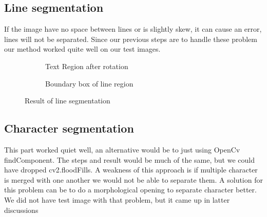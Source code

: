 \documentclass[Report.tex]{subfiles}
\begin{document}
\subsection{Line segmentation}
If the image have no space between lines or is slightly skew, it can cause an error, lines will not be separated. Since our previous steps are to handle these problem our method worked quite well on our test images.
\begin{figure}[ht]
  \centering
  \begin{subfigure}[t]{6cm}
    \caption{Text Region after rotation}
  \end{subfigure}
  \hspace{2cm}%
  \begin{subfigure}[t]{6cm}
    \caption{Boundary box of line region}
  \end{subfigure}

  \caption{Result of line segmentation}
  \label{fig:result:rotation}
\end{figure}

\subsection{Character segmentation}
This part worked quiet well, an alternative would be to just using OpenCv findComponent. The steps and result would be much of the same, but we could have dropped cv2.floodFills. A weakness of this approach is if multiple character is merged with one another we would not be able to separate them. A solution for this problem can be to do a morphological opening to separate character better. We did not have test image with that problem, but it came up in latter discussions
\end{document}
